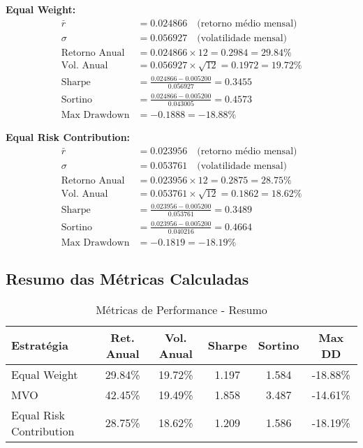 \textbf{Equal Weight:}
\begin{align}
\bar{r} &= 0.024866 \quad \text{(retorno médio mensal)} \\
\sigma &= 0.056927 \quad \text{(volatilidade mensal)} \\
\text{Retorno Anual} &= 0.024866 \times 12 = 0.2984 = 29.84\% \\
\text{Vol. Anual} &= 0.056927 \times \sqrt{12} = 0.1972 = 19.72\% \\
\text{Sharpe} &= \frac{0.024866 - 0.005200}{0.056927} = 0.3455 \\
\text{Sortino} &= \frac{0.024866 - 0.005200}{0.043005} = 0.4573 \\
\text{Max Drawdown} &= -0.1888 = -18.88\%
\end{align}

\textbf{Equal Risk Contribution:}
\begin{align}
\bar{r} &= 0.023956 \quad \text{(retorno médio mensal)} \\
\sigma &= 0.053761 \quad \text{(volatilidade mensal)} \\
\text{Retorno Anual} &= 0.023956 \times 12 = 0.2875 = 28.75\% \\
\text{Vol. Anual} &= 0.053761 \times \sqrt{12} = 0.1862 = 18.62\% \\
\text{Sharpe} &= \frac{0.023956 - 0.005200}{0.053761} = 0.3489 \\
\text{Sortino} &= \frac{0.023956 - 0.005200}{0.040216} = 0.4664 \\
\text{Max Drawdown} &= -0.1819 = -18.19\%
\end{align}

\subsection{Resumo das Métricas Calculadas}

\begin{table}[H]
\centering
\caption{Métricas de Performance - Resumo}
\begin{tabular}{|l|c|c|c|c|c|}
\hline
\textbf{Estratégia} & \textbf{Ret. Anual} & \textbf{Vol. Anual} & \textbf{Sharpe} & \textbf{Sortino} & \textbf{Max DD} \\
\hline
Equal Weight & 29.84\% & 19.72\% & 1.197 & 1.584 & -18.88\% \\
MVO & 42.45\% & 19.49\% & 1.858 & 3.487 & -14.61\% \\
Equal Risk Contribution & 28.75\% & 18.62\% & 1.209 & 1.586 & -18.19\% \\
\hline
\end{tabular}
\end{table}

